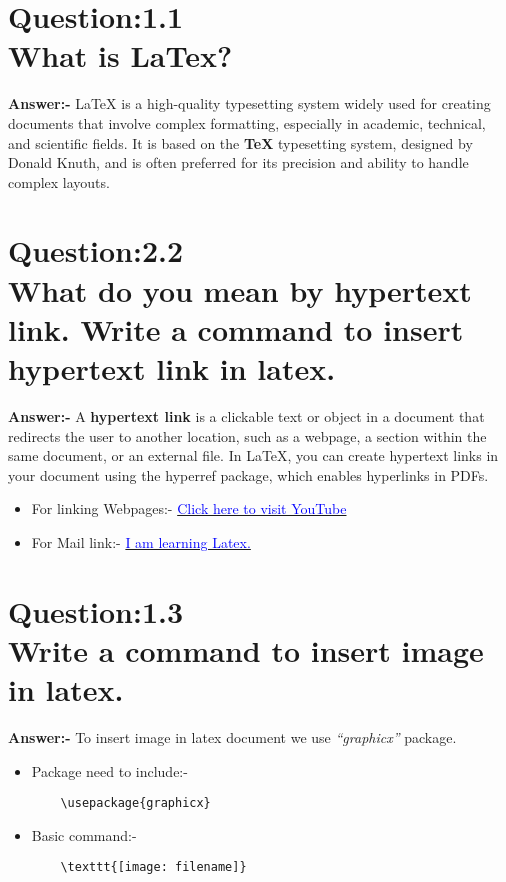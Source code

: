 \newpage
\section*{Question:1.1 \\ What is LaTex?}
\textbf{Answer:-} LaTeX is a high-quality typesetting system widely used for creating documents that involve complex formatting, especially in academic, technical, and scientific fields. It is based on the \textbf{TeX} typesetting system, designed by Donald Knuth, and is often preferred for its precision and ability to handle complex layouts.

\section*{Question:2.2 \\ What do you mean by hypertext link. Write a command to insert hypertext link in latex.
}
\textbf{Answer:-} A \textbf{hypertext link} is a clickable text or object in a document that redirects the user to another location, such as a webpage, a section within the same document, or an external file. In LaTeX, you can create hypertext links in your document using the hyperref package, which enables hyperlinks in PDFs.\\
\begin{itemize}
    \item For linking Webpages:-
    \href{https://www.youtube.com}{\textcolor{blue}{Click here to visit YouTube}}
    \item For Mail link:-
    \href{mailto:28090@arsd.du.ac.in}{\textcolor{blue}{I am learning Latex.}}
    
\end{itemize}

\section*{Question:1.3 \\ Write a command to insert image in latex.}
\textbf{Answer:-} To insert image in latex document we use \textit{“graphicx”} package.

\begin{itemize}
    \item Package need to include:-
    \begin{verbatim}
    \usepackage{graphicx}
    \end{verbatim}
    \vspace{1cm}
    \item Basic command:-
    \begin{verbatim}
    \texttt{[image: filename]}
    \end{verbatim}    
\end{itemize}



